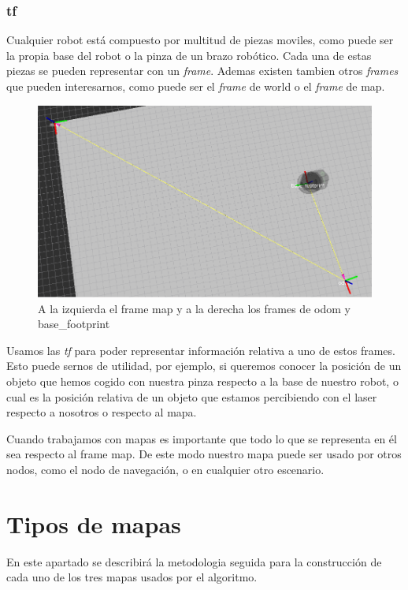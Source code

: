 \subsubsection{tf}
\label{subsubsec:tf}
Cualquier robot está compuesto por multitud de piezas moviles, como puede ser la propia base del robot o la pinza de un brazo robótico. Cada una de estas piezas se pueden representar con un \textit{frame}. Ademas existen tambien otros \textit{frames} que pueden interesarnos, como puede ser el \textit{frame} de world o el \textit{frame} de map.
\begin{figure} [hbtp]
  \begin{center}
    \includegraphics[width=12cm]{img/cap4/frames}
  \end{center}
  \caption{A la izquierda el frame map y a la derecha los frames de odom y base\_footprint}
  \label{fig:frames}
\end{figure}

Usamos las \textit{tf} para poder representar información relativa a uno de estos frames. Esto puede sernos de utilidad, por ejemplo, si queremos conocer la posición de un objeto que hemos cogido con nuestra pinza respecto a la base de nuestro robot, o cual es la posición relativa de un objeto que estamos percibiendo con el laser respecto a nosotros o respecto al mapa.

Cuando trabajamos con mapas es importante que todo lo que se representa en él sea respecto al frame map. De este modo nuestro mapa puede ser usado por otros nodos, como el nodo de navegación, o en cualquier otro escenario. \pagebreak

\section{Tipos de mapas}

En este apartado se describirá la metodologia seguida para la construcción de cada uno de los tres mapas usados por el algoritmo.

